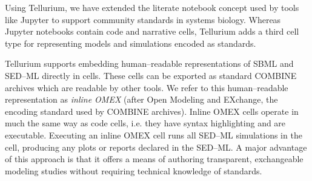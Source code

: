 \documentclass[10pt,letterpaper]{article}
\begin{document}
Using Tellurium, we have extended the literate notebook concept used by tools like Jupyter \cite{ragan2014jupyter} to support community standards in systems biology. Whereas Jupyter notebooks contain code and narrative cells, Tellurium adds a third cell type for representing models and simulations encoded as standards. %


Tellurium supports embedding human--readable representations of SBML \cite{smith2009antimony} and SED--ML \cite{choi2016phrased} directly in cells. These cells can be exported as standard COMBINE archives which are readable by other tools. We refer to this human--readable representation as \textit{inline OMEX} (after Open Modeling and EXchange, the encoding standard used by COMBINE archives).
Inline OMEX cells operate in much the same way as code cells, i.e. they have syntax highlighting and are executable. Executing an inline OMEX cell runs all SED--ML simulations in the cell, producing any plots or reports declared in the SED--ML. A major advantage of this approach is that it offers a means of authoring transparent, exchangeable modeling studies without requiring technical knowledge of standards.



\end{document}
